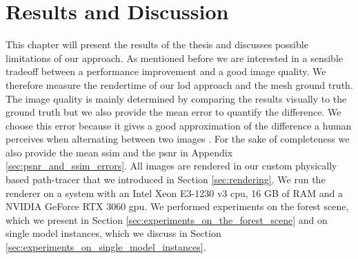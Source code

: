 \chapter{Results and Discussion}
\label{chap:results_and_discussion}
This chapter will present the results of the thesis and discusses possible limitations of our approach.
As mentioned before we are interested in a sensible tradeoff between a performance improvement and a good image quality.
We therefore measure the rendertime of our \ac{lod} approach and the mesh ground truth.
The image quality is mainly determined by comparing the results visually to the ground truth but we also provide the mean \FLIP \cite{flip} error to quantify the difference.
We choose this error because it gives a good approximation of the difference a human perceives when alternating between two images \cite{flip}.
For the sake of completeness we also provide the mean \ac{ssim} and the \ac{psnr} in Appendix \ref{sec:psnr_and_ssim_errors}.
All images are rendered in our custom physically based path-tracer that we introduced in Section \ref{sec:rendering}.
We run the renderer on a system with an Intel Xeon E3-1230 v3 \ac{cpu}, 16 GB of RAM and a NVIDIA GeForce RTX 3060 \ac{gpu}.
We performed experiments on the forest scene, which we present in Section \ref{sec:experiments_on_the_forest_scene} and on single model instances, which we discuss in Section \ref{sec:experiments_on_single_model_instances}.

